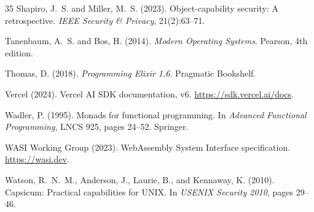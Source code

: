 \documentclass[12pt,a4paper]{article}
\theoremstyle{plain}
\theoremstyle{definition}
\begin{document}
\begin{thebibliography}{35}
Shapiro, J.~S. and Miller, M.~S. (2023).
\newblock Object-capability security: A retrospective.
\newblock \emph{IEEE Security \& Privacy}, 21(2):63--71.

Tanenbaum, A.~S. and Bos, H. (2014).
\newblock \emph{Modern Operating Systems}.
\newblock Pearson, 4th edition.

Thomas, D. (2018).
\newblock \emph{Programming Elixir 1.6}.
\newblock Pragmatic Bookshelf.

Vercel (2024).
\newblock Vercel AI SDK documentation, v6.
\newblock \url{https://sdk.vercel.ai/docs}.

Wadler, P. (1995).
\newblock Monads for functional programming.
\newblock In \emph{Advanced Functional Programming}, LNCS 925, pages 24--52. Springer.

WASI Working Group (2023).
\newblock WebAssembly System Interface specification.
\newblock \url{https://wasi.dev}.

Watson, R.~N.~M., Anderson, J., Laurie, B., and Kennaway, K. (2010).
\newblock Capsicum: Practical capabilities for UNIX.
\newblock In \emph{USENIX Security 2010}, pages 29--46.

\end{thebibliography}
\end{document}
